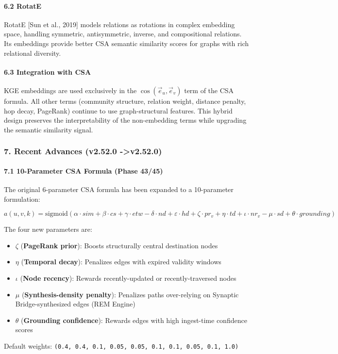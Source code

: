 \paragraph{6.2 RotatE}
RotatE [Sun et al., 2019] models relations as rotations in complex embedding space, handling symmetric, antis\-ymmetric, inverse, and compo\-sitional relations. Its embeddings provide better CSA semantic similarity scores for graphs with rich relational diversity.

\paragraph{6.3 Integration with CSA}
KGE embeddings are used exclusively in the $\cos(\vec{e}_u, \vec{e}_v)$ term of the CSA formula. All other terms (community structure, relation weight, distance penalty, hop decay, PageRank) continue to use graph-structural features. This hybrid design preserves the inter\-pretability of the non-embedding terms while upgrading the semantic similarity signal.

\subsubsection{7. Recent Advances (v2.52.0 -\textgreater  v2.52.0)}

\paragraph{7.1 10-Parameter CSA Formula (Phase 43/45)}
The original 6-parameter CSA formula has been expanded to a 10-parameter formulation:

\begin{equation}
a(u,v,k) = \text{sigmoid}(\alpha \cdot sim + \beta \cdot cs + \gamma \cdot etw - \delta \cdot nd + \varepsilon \cdot hd + \zeta \cdot pr_v + \eta \cdot td + \iota \cdot nr_v - \mu \cdot sd + \theta \cdot grounding)
\end{equation}

The four new parameters are:
\begin{itemize}
\item $\zeta$ (\textbf{PageRank prior}): Boosts struc\-turally central destination nodes
\item $\eta$ (\textbf{Temporal decay}): Penalizes edges with expired validity windows
\item $\iota$ (\textbf{Node recency}): Rewards recently-updated or recently-traversed nodes
\item $\mu$ (\textbf{Synthesis-density penalty}): Penalizes paths over-relying on Synaptic Bridge-synthesized edges (REM Engine)
\item $\theta$ (\textbf{Grounding confidence}): Rewards edges with high ingest-time confidence scores

\end{itemize}
Default weights: \texttt{(0.4, 0.4, 0.1, 0.05, 0.05, 0.1, 0.1, 0.05, 0.1, 1.0)}

